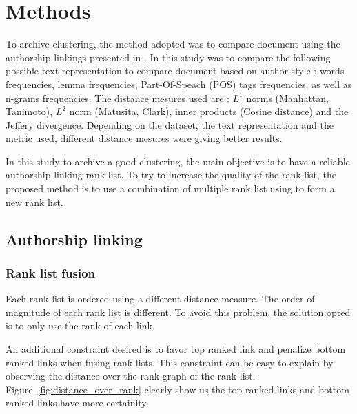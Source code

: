 \section{Methods}

To archive clustering, the method adopted was to compare document using the authorship linkings presented in \cite{kocher_verification}.
In this study was to compare the following possible text representation to compare document based on author style : words frequencies, lemma frequencies, Part-Of-Speach (POS) tags frequencies, as well as n-grams frequencies.
The distance mesures used are : $L^1$ norms (Manhattan, Tanimoto), $L^2$ norm (Matusita, Clark), inner products (Cosine distance) and the Jeffery divergence.
Depending on the dataset, the text representation and the metric used, different distance mesures were giving better results.

In this study to archive a good clustering, the main objective is to have a reliable authorship linking rank list.
To try to increase the quality of the rank list, the proposed method is to use a combination of multiple rank list using to form a new rank list.

\subsection{Authorship linking}

\subsubsection{Rank list fusion}

Each rank list is ordered using a different distance measure. The order of magnitude of each rank list is different. To avoid this problem, the solution opted is to only use the rank of each link.

An additional constraint desired is to favor top ranked link and penalize bottom ranked links when fusing rank lists.
This constraint can be easy to explain by observing the distance over the rank graph of the rank list.
Figure~\ref{fig:distance_over_rank} clearly show us the top ranked links and bottom ranked links have more certainity.

